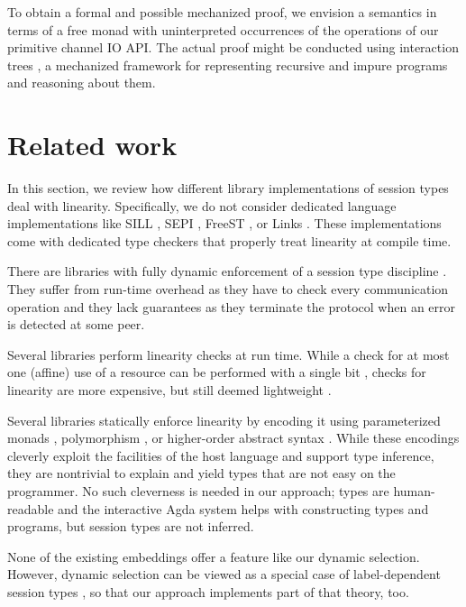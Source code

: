 \documentclass[acmsmall,review,anonymous,screen]{acmart}
\begin{document}
To obtain a formal and possible mechanized proof, we envision a
semantics in terms of a free monad
\cite{DBLP:journals/jfp/Swierstra08,DBLP:conf/haskell/KiselyovI15}
with uninterpreted occurrences of 
the operations of our primitive channel IO API. The actual proof might be
conducted using interaction trees
\cite{DBLP:journals/pacmpl/XiaZHHMPZ20}, a mechanized framework for
representing recursive and impure programs and  reasoning about them.

\section{Related work}
\label{sec:related-work}

In this section, we review how different library implementations of
session types deal with linearity. Specifically, we do not consider
dedicated language implementations like
SILL \cite{DBLP:conf/esop/ToninhoCP13},
SEPI \cite{DBLP:conf/sefm/FrancoV13},
FreeST \cite{DBLP:journals/iandc/AlmeidaMTV22},
or Links \cite{lindley17:_light_funct_session_types}. These
implementations come with dedicated type checkers that properly treat
linearity at compile time.

There are libraries with fully dynamic enforcement of a session type
discipline
\cite{DBLP:conf/rv/HuNYDH13,DBLP:journals/pacmpl/MelgrattiP17}. They
suffer from run-time overhead as they have to check every
communication operation and they lack guarantees as they terminate the
protocol when an error is detected at some peer. 

Several libraries perform
linearity checks at run time. While a check for at most one (affine)
use of a resource can be performed with a single bit
\cite{DBLP:conf/esop/TovP10},  checks for linearity are more
expensive, but still deemed lightweight
\cite{DBLP:conf/fase/HuY16}.

Several libraries statically enforce linearity by encoding it
using parameterized monads
\cite{SackmanE08,DBLP:conf/haskell/PucellaT08},  polymorphism
\cite{DBLP:journals/scp/ImaiYY19}, or higher-order 
abstract syntax \cite{DBLP:conf/haskell/LindleyM16}. While these
encodings cleverly exploit the facilities of the host language and
support type inference, they
are nontrivial to explain and yield types that are not easy on the
programmer. No such cleverness is needed in our approach; types are
human-readable and the interactive Agda system helps with constructing
types and programs, but session types are not inferred.

None of the existing embeddings offer a feature like our dynamic
selection. However, dynamic selection can be viewed as a special case
of label-dependent session types
\cite{DBLP:journals/pacmpl/ThiemannV20}, so that our  approach
implements part of that theory, too.
\end{document}
